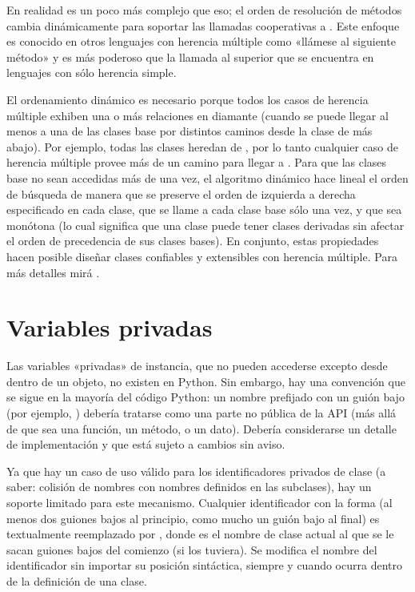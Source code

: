 \documentclass[a4,10pt,spanish]{sphinxmanual}
\begin{document}
\sphinxAtStartPar
En realidad es un poco más complejo que eso; el orden de resolución de métodos cambia dinámicamente para soportar las llamadas cooperativas a .  Este enfoque es conocido en otros lenguajes con herencia múltiple como «llámese al siguiente método» y es más poderoso que la llamada al superior que se encuentra en lenguajes con sólo herencia simple.

\sphinxAtStartPar
El ordenamiento dinámico es necesario porque todos los casos de herencia múltiple exhiben una o más relaciones en diamante (cuando se puede llegar al menos a una de las clases base por distintos caminos desde la clase de más abajo).  Por ejemplo, todas las clases heredan de , por lo tanto cualquier caso de herencia múltiple provee más de un camino para llegar a .  Para que las clases base no sean accedidas más de una vez, el algoritmo dinámico hace lineal el orden de búsqueda de manera que se preserve el orden de izquierda a derecha especificado en cada clase, que se llame a cada clase base sólo una vez, y que sea monótona (lo cual significa que una clase puede tener clases derivadas sin afectar el orden de precedencia de sus clases bases).  En conjunto, estas propiedades hacen posible diseñar clases confiables y extensibles con herencia múltiple. Para más detalles mirá  .


\section{Variables privadas}
\label{\detokenize{tutorial/classes:private-variables}}\label{\detokenize{tutorial/classes:tut-private}}
\sphinxAtStartPar
Las variables «privadas» de instancia, que no pueden accederse excepto desde dentro de un objeto, no existen en Python.  Sin embargo, hay una convención que se sigue en la mayoría del código Python: un nombre prefijado con un guión bajo (por ejemplo, ) debería tratarse como una parte no pública de la API (más allá de que sea una función, un método, o un dato).  Debería considerarse un detalle de implementación y que está sujeto a cambios sin aviso.

\ignorespaces 
\sphinxAtStartPar
Ya que hay un caso de uso válido para los identificadores privados de clase (a saber: colisión de nombres con nombres definidos en las subclases), hay un soporte limitado para este mecanismo.  Cualquier identificador con la forma  (al menos dos guiones bajos al principio, como mucho un guión bajo al final) es textualmente reemplazado por , donde  es el nombre de clase actual al que se le sacan guiones bajos del comienzo (si los tuviera).  Se modifica el nombre del identificador sin importar su posición sintáctica, siempre y cuando ocurra dentro de la definición de una clase.
\end{document}
